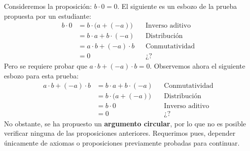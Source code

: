 \documentclass[11pt]{article}
\begin{document}
Consideremos la proposición: $b\cdot 0 = 0$. El siguiente es un esbozo de la prueba propuesta por un estudiante:
%
%
\vspace{1em} \begin{align*}
    b\cdot 0 &= b\cdot \bigl(a+ (-a)\bigr) && \text{Inverso aditivo}\\
    &= b\cdot a + b\cdot (-a) && \text{Distribución}\\
    &= a\cdot b + (-a) \cdot b && \text{Conmutatividad}\\
    &= 0 && \text{¿?}
\end{align*}
Pero se requiere probar que $a\cdot b+(-a)\cdot b=0$. Observemos ahora el siguiente esbozo para esta prueba: \vspace{1em} \begin{align*}
    a\cdot b+ (-a) \cdot b &= b\cdot a + b\cdot (-a) && \text{Conmutatividad}\\
    &= b\cdot \bigl(a+(-a)\bigr) && \text{Distribución}\\
    &= b\cdot 0 && \text{Inverso aditivo}\\
    &= 0 && \text{¿?}
\end{align*}
No obstante, se ha propuesto un \textbf{argumento circular}, por lo que no es posible verificar ninguna de las proposiciones anteriores. Requerimos pues, depender únicamente de axiomas o proposiciones previamente probadas para continuar.
\end{document}
